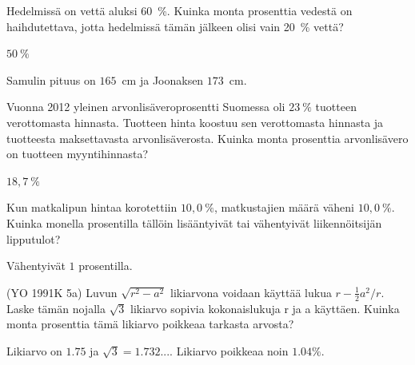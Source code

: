 \begin{tehtavasivu}
\begin{tehtava}
    Hedelmissä on vettä aluksi 60~\%. Kuinka monta prosenttia vedestä on 
    haihdutettava, jotta hedelmissä tämän jälkeen olisi vain 20~\% vettä?
    \begin{vastaus}
        $50~\%$
    \end{vastaus}
\end{tehtava}


\begin{tehtava}
    Samulin pituus on $165$~cm ja Joonaksen $173$~cm.
    \begin{alakohdat}
    \end{alakohdat}
    \begin{vastaus}
        \begin{alakohdat}
        \end{alakohdat}
    \end{vastaus}
\end{tehtava}

\begin{tehtava}
    Vuonna 2012 yleinen arvonlisäveroprosentti Suomessa oli $23~\%$ tuotteen
    verottomasta hinnasta. Tuotteen hinta koostuu sen verottomasta hinnasta 
    ja tuotteesta maksettavasta arvonlisäverosta. Kuinka monta 
    prosenttia arvonlisävero on tuotteen myyntihinnasta?
    \begin{vastaus}
        $18,7~\%$
    \end{vastaus}
\end{tehtava}

\begin{tehtava}
    Kun matkalipun hintaa korotettiin $10,0~\%$, matkustajien määrä väheni $10,0~\%$.
    Kuinka monella prosentilla tällöin lisääntyivät tai vähentyivät liikennöitsijän 
    lipputulot?
    \begin{vastaus}
        Vähentyivät $1$ prosentilla.
    \end{vastaus}
\end{tehtava}


\begin{tehtava}
    (YO 1991K 5a) Luvun $\sqrt{r^2-a^2}$ likiarvona voidaan käyttää lukua $r-{\frac{1}{2}a^2}/r$. Laske tämän nojalla $\sqrt{3}$ likiarvo sopivia kokonaislukuja r ja a käyttäen. Kuinka monta prosenttia tämä likiarvo poikkeaa tarkasta arvosta?
    \begin{vastaus}
        Likiarvo on $1.75$ ja $\sqrt{3}=1.732...$. Likiarvo poikkeaa noin $1.04\%$.
    \end{vastaus}
\end{tehtava}


\end{tehtavasivu}
